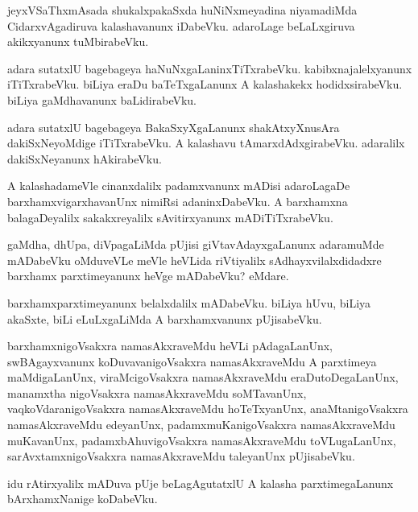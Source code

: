 \documentclass{article}
\begin{document}
\begin{mn}%
jeyxVSaThxmAsada shukalxpakaSxda huNiNxmeyadina niyamadiMda
CidarxvAgadiruva kalashavanunx iDabeVku. adaroLage beLaLxgiruva
akikxyanunx tuMbirabeVku.
\end{mn}

\begin{mn}
adara sutatxlU bagebageya
haNuNxgaLaninxTiTxrabeVku. kabibxnajalelxyanunx iTiTxrabeVku. biLiya
eraDu baTeTxgaLanunx A kalashakekx hodidxsirabeVku. biLiya
gaMdhavanunx baLidirabeVku.
\end{mn}

\begin{mn}
adara sutatxlU bagebageya BakaSxyXgaLanunx shakAtxyXnusAra
dakiSxNeyoMdige iTiTxrabeVku. A kalashavu
tAmarxdAdxgirabeVku. adaralilx dakiSxNeyanunx hAkirabeVku.
\end{mn}

\begin{mn}
A kalashadameVle cinanxdalilx padamxvanunx mADisi adaroLagaDe
barxhamxvigarxhavanUnx nimiRsi adaninxDabeVku. A barxhamxna
balagaDeyalilx sakakxreyalilx sAvitirxyanunx mADiTiTxrabeVku.
\end{mn}

\begin{mn}%
gaMdha, dhUpa, diVpagaLiMda pUjisi giVtavAdayxgaLanunx adaramuMde
mADabeVku oMduveVLe meVle heVLida riVtiyalilx sAdhayxvilalxdidadxre
barxhamx parxtimeyanunx heVge mADabeVku? eMdare.
\end{mn}

\begin{mn}
barxhamxparxtimeyanunx belalxdalilx mADabeVku. biLiya hUvu, biLiya
akaSxte, biLi eLuLxgaLiMda A barxhamxvanunx pUjisabeVku.
\end{mn}

\begin{mn}%
barxhamxnigoVsakxra namasAkxraveMdu heVLi pAdagaLanUnx, swBAgayxvanunx
koDuvavanigoVsakxra namasAkxraveMdu A parxtimeya maMdigaLanUnx,
viraMcigoVsakxra namasAkxraveMdu eraDutoDegaLanUnx, manamxtha
nigoVsakxra namasAkxraveMdu soMTavanUnx, vaqkoVdaranigoVsakxra
namasAkxraveMdu hoTeTxyanUnx, anaMtanigoVsakxra namasAkxraveMdu
edeyanUnx, padamxmuKanigoVsakxra namasAkxraveMdu muKavanUnx,
padamxbAhuvigoVsakxra namasAkxraveMdu toVLugaLanUnx,
sarAvxtamxnigoVsakxra namasAkxraveMdu taleyanUnx pUjisabeVku. 
\end{mn}

\begin{mn}
idu rAtirxyalilx mADuva pUje beLagAgutatxlU A kalasha parxtimegaLanunx
bArxhamxNanige koDabeVku.
\end{mn}
\end{document}
